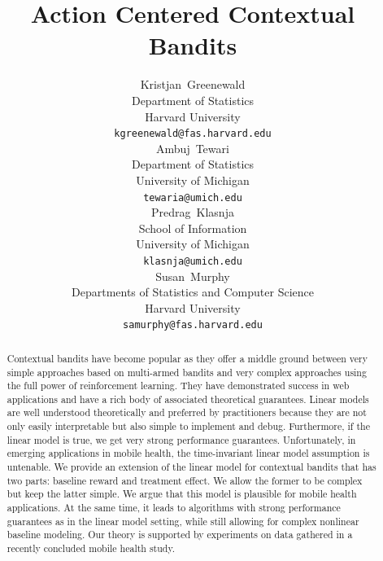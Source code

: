 \documentclass{article}
\title{Action Centered Contextual Bandits}
\author{
  Kristjan~Greenewald\\ %
  Department of Statistics\\
  Harvard University\\
  \texttt{kgreenewald@fas.harvard.edu} \\
  \And
  Ambuj~Tewari\\
  Department of Statistics\\
  University of Michigan\\
  \texttt{tewaria@umich.edu} \\
   \And
  Predrag~Klasnja \\
  School of Information\\
  University of Michigan\\
  \texttt{klasnja@umich.edu} \\
  \AND
  Susan~Murphy \\
  Departments of Statistics and Computer Science\\
  Harvard University\\
  \texttt{samurphy@fas.harvard.edu} \\
}
\begin{document}

\maketitle

%  
\begin{abstract}  
Contextual bandits have become popular as they offer a middle ground between very simple approaches based on multi-armed bandits and very complex approaches
using the full power of reinforcement learning. They have demonstrated success in web applications and have a rich body of associated theoretical guarantees.
Linear models are well understood theoretically and preferred by practitioners because they are not only easily interpretable but also simple to implement and debug.
Furthermore, if the linear model is true,
we get very strong performance guarantees. Unfortunately, in emerging applications in mobile health, the time-invariant linear model assumption is untenable.
We provide an extension of the linear model for contextual bandits that has two parts: baseline reward and treatment effect. We allow the former to be complex but keep the latter simple.
We argue that this model is plausible for mobile health applications. At the same time, it leads to algorithms with strong performance guarantees as in the linear model setting, while still allowing for complex nonlinear baseline modeling.
Our theory is supported by experiments on data gathered in a recently concluded mobile health study.
\end{abstract}

\end{document}
